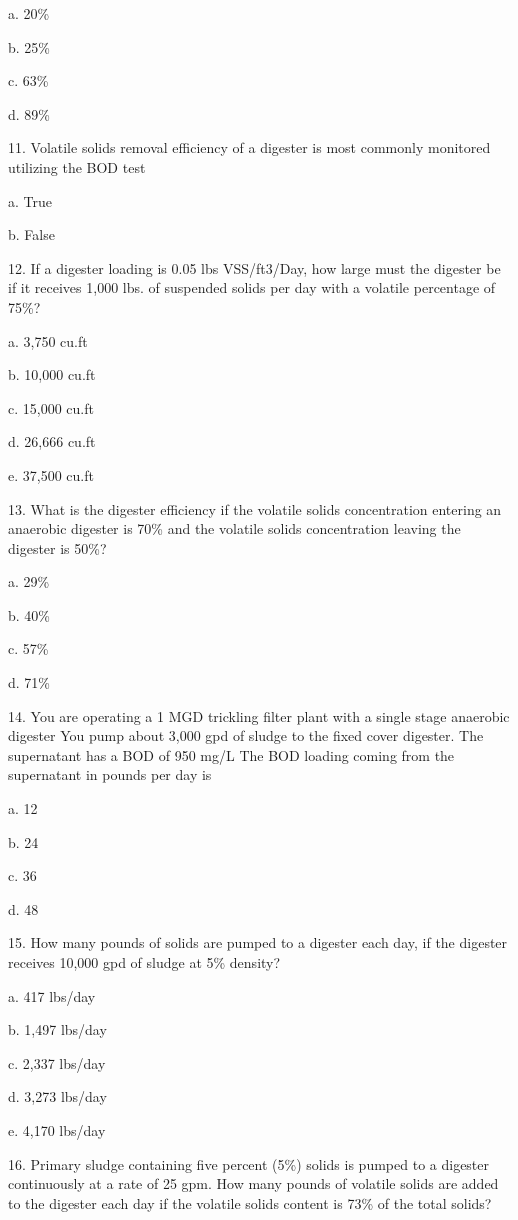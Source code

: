 \documentclass{article}
\begin{document}
a. 20\% 

b. 25\% 

c. 63\% 

d. 89\% 


11. Volatile solids removal efficiency of a digester is most commonly monitored utilizing the BOD test

a. True 

b. False 


12. If a digester loading is 0.05 lbs VSS/ft3/Day, how large must the digester be if it receives 1,000 lbs. of suspended solids per day with a volatile percentage of 75\%? 

a. 3,750 cu.ft 

b. 10,000 cu.ft 

c. 15,000 cu.ft 

d. 26,666 cu.ft 

e. 37,500 cu.ft 


13. What is the digester efficiency if the volatile solids concentration entering an anaerobic digester is 70\% and the volatile solids concentration leaving the digester is 50\%? 

a. 29\% 

b. 40\% 

c. 57\% 

d. 71\% 


14. You are operating a 1 MGD trickling filter plant with a single stage anaerobic digester You pump about 3,000 gpd of sludge to the fixed cover digester. The supernatant has a BOD of 950 mg/L The BOD loading coming from the supernatant in pounds per day is 

a. 12 

b. 24 

c. 36 

d. 48 


15. How many pounds of solids are pumped to a digester each day, if the digester receives 10,000 gpd of sludge at 5\% density? 

a. 417 lbs/day 

b. 1,497 lbs/day 

c. 2,337 lbs/day 

d. 3,273 lbs/day 

e. 4,170 lbs/day 


16. Primary sludge containing five percent (5\%) solids is pumped to a digester continuously at a rate of 25 gpm. How many pounds of volatile solids are added to the digester each day if the volatile solids content is 73\% of the total solids? 
\end{document}
